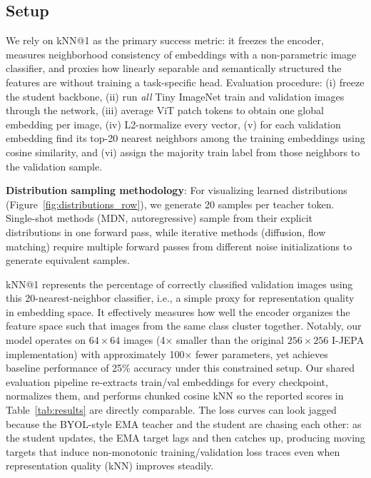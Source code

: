 \documentclass[conference]{IEEEtran}
\begin{document}
\subsection{Setup}
We rely on kNN@1 as the primary success metric: it freezes the encoder, measures neighborhood consistency of embeddings with a non-parametric image classifier, and proxies how linearly separable and semantically structured the features are without training a task-specific head.
Evaluation procedure: (i) freeze the student backbone, (ii) run \emph{all} Tiny ImageNet train and validation images through the network, (iii) average ViT patch tokens to obtain one global embedding per image, (iv) L2-normalize every vector, (v) for each validation embedding find its top-20 nearest neighbors among the training embeddings using cosine similarity, and (vi) assign the majority train label from those neighbors to the validation sample.

\textbf{Distribution sampling methodology}: For visualizing learned distributions (Figure~\ref{fig:distributions_row}), we generate 20 samples per teacher token. Single-shot methods (MDN, autoregressive) sample from their explicit distributions in one forward pass, while iterative methods (diffusion, flow matching) require multiple forward passes from different noise initializations to generate equivalent samples.

kNN@1 represents the percentage of correctly classified validation images using this 20-nearest-neighbor classifier, i.e., a simple proxy for representation quality in embedding space.
It effectively measures how well the encoder organizes the feature space such that images from the same class cluster together.
Notably, our model operates on $64\times64$ images (4× smaller than the original $256\times256$ I-JEPA implementation) with approximately 100× fewer parameters, yet achieves baseline performance of 25\% accuracy under this constrained setup.
Our shared evaluation pipeline re-extracts train/val embeddings for every checkpoint, normalizes them, and performs chunked cosine kNN so the reported scores in Table~\ref{tab:results} are directly comparable.
The loss curves can look jagged because the BYOL-style EMA teacher and the student are chasing each other: as the student updates, the EMA target lags and then catches up, producing moving targets that induce non-monotonic training/validation loss traces even when representation quality (kNN) improves steadily.
\end{document}
